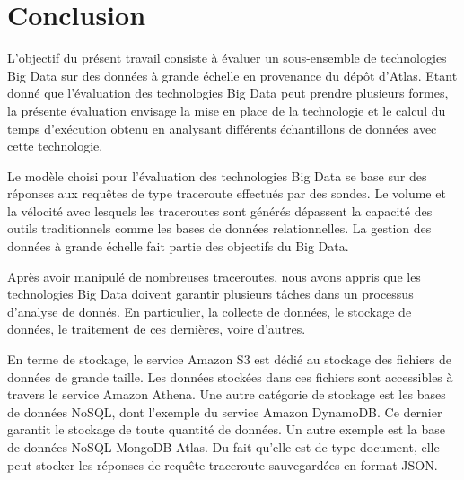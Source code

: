 \chapter*{Conclusion}

L'objectif du présent travail consiste à évaluer un sous-ensemble de technologies Big Data sur des données à grande échelle en provenance du dépôt d'Atlas. Etant donné que l'évaluation des technologies Big Data peut prendre plusieurs formes, la présente évaluation envisage 
 la mise en place de la technologie  et   le calcul du temps d'exécution obtenu en analysant différents échantillons de données avec cette technologie.
 
 Le modèle choisi pour l'évaluation des technologies Big Data se base sur des réponses aux requêtes de type traceroute effectués par des sondes.  Le volume et la vélocité  avec lesquels les traceroutes  sont générés dépassent la capacité des outils traditionnels comme les bases de données relationnelles. La gestion des données à grande échelle  fait partie des objectifs du Big Data.







 
Après avoir manipulé de nombreuses traceroutes, nous avons appris que les technologies Big Data doivent garantir plusieurs tâches dans un processus d'analyse de donnés. En particulier, la collecte de données, le stockage de données, le traitement de ces dernières, voire d'autres.

 En terme de stockage,   le service Amazon S3 est dédié au stockage des fichiers de données de grande taille. Les données stockées dans ces fichiers sont accessibles à travers le service Amazon Athena. 
  Une autre catégorie de stockage est  les bases de données NoSQL, dont l'exemple  du service Amazon DynamoDB. Ce dernier   garantit le stockage de toute quantité de données. Un autre exemple est la base   de données NoSQL   MongoDB Atlas. Du fait qu'elle est de type document, elle peut stocker les réponses de requête traceroute sauvegardées en format JSON.  
  
